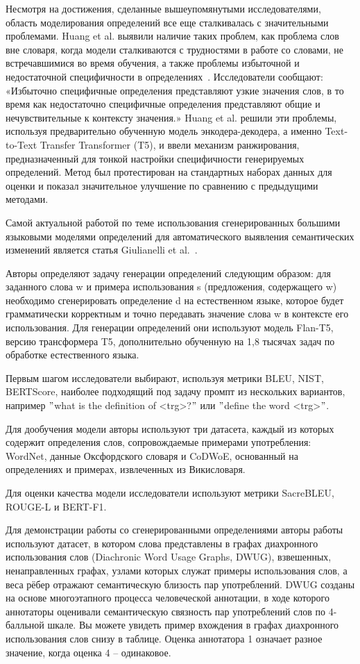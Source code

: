 \documentclass[LI,VKR]{HSEUniversity}
\begin{document}
Несмотря на достижения, сделанные вышеупомянутыми исследователями,
область моделирования определений все еще сталкивалась с значительными проблемами.
Huang et al. выявили наличие таких проблем,
как проблема слов вне словаря, когда модели сталкиваются с трудностями в работе со словами,
не встречавшимися во время обучения, а также проблемы избыточной и недостаточной
специфичности в определениях~\cite{huang-etal-2021-definition}.
Исследователи сообщают: «Избыточно специфичные определения представляют узкие значения слов,
в то время как недостаточно специфичные определения представляют общие и
нечувствительные к контексту значения.»
Huang et al. решили эти проблемы,
используя предварительно обученную модель энкодера-декодера,
а именно Text-to-Text Transfer Transformer (T5),
и ввели механизм ранжирования, предназначенный для тонкой настройки специфичности
генерируемых определений.
Метод был протестирован на стандартных наборах данных для оценки и показал значительное
улучшение по сравнению с предыдущими методами.

Самой актуальной работой по теме использования сгенерированных большими языковыми моделями
определений для автоматического выявления семантических изменений является статья
Giulianelli et al.~\cite{DefinitionGenerationMainArticle}.

Авторы определяют задачу генерации определений следующим образом: для заданного слова w и примера
использования s (предложения, содержащего w) необходимо сгенерировать определение d на
естественном языке, которое будет грамматически корректным и точно передавать значение слова
w в контексте его использования.
Для генерации определений они используют модель Flan-T5, версию трансформера T5,
дополнительно обученную на 1,8 тысячах задач по обработке естественного языка.

Первым шагом исследователи выбирают, используя метрики BLEU, NIST, BERTScore, наиболее
подходящий под задачу промпт из нескольких вариантов, например
\("\)what is the definition of <trg>?\("\) или \("\)define the word <trg>\("\).

Для дообучения модели авторы используют три датасета, каждый из которых содержит определения
слов, сопровождаемые примерами употребления: WordNet, данные Оксфордского словаря и CoDWoE,
основанный на определениях и примерах, извлеченных из Викисловаря.

Для оценки качества модели исследователи используют метрики SacreBLEU, ROUGE-L и BERT-F1.

Для демонстрации работы со сгенерированными определениями авторы
работы используют датасет, в котором слова представлены в графах диахронного использования
слов (Diachronic Word Usage Graphs, DWUG), взвешенных, ненаправленных графах,
узлами которых служат примеры использования слов, а веса рёбер отражают семантическую
близость пар употреблений.
DWUG созданы на основе многоэтапного процесса человеческой аннотации, в ходе которого аннотаторы
оценивали семантическую связность пар употреблений слов по 4-балльной шкале.
Вы можете увидеть пример вхождения в графах диахронного использования
слов снизу в таблице.
Оценка аннотатора 1 означает разное значение, когда оценка 4 – одинаковое.
\end{document}
